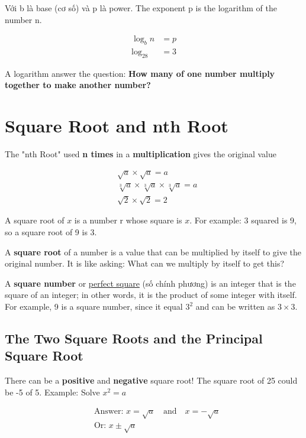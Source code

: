Với b là base (cơ số) và p là power. The exponent p is the logarithm of the number n.

\begin{equation}
  \begin{aligned}
    \log_bn&=p\\
    \log_28&=3
  \end{aligned}
  \label{log_eqn}
\end{equation}

A logarithm answer the question: \textbf{How many of one number multiply together to make another number?}

\section{Square Root and nth Root}

The "nth Root" used \textbf{n times} in a \textbf{multiplication} gives the original value

\[
  \begin{aligned}
    &\sqrt{a} \times \sqrt{a} = a\\
    &\sqrt[3]{a} \times \sqrt[3]{a} \times \sqrt[3]{a} = a\\
    &\sqrt{2} \times \sqrt{2} = 2
  \end{aligned}
\]

A square root of $x$ is a number r whose square is $x$. For example: 3 squared is 9, so a square root of 9 is 3.

A \textbf{square root} of a number is a value that can be multiplied by itself to give the original number. It is like asking: What can we multiply by itself to get this?

A \textbf{square number} or \href{https://en.wikipedia.org/wiki/Square_number}{perfect square} (số chính phương) is an integer that is the square of an integer; in other words, it is the product of some integer with itself. For example, 9 is a square number, since it equal $3^{2}$ and can be written as $3 \times 3$.

\subsection{The Two Square Roots and the Principal Square Root}

There can be a \textbf{positive} and \textbf{negative} square root! The square root of 25 could be -5 of 5.
Example: Solve $x^{2}=a$

\[
  \begin{aligned}
    &\text{Answer: }x = \sqrt{a} \quad \text{and} \quad x = -\sqrt{a}\\
    &\text{Or: } x \pm \sqrt{a}
  \end{aligned}
\]


